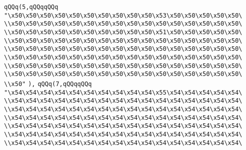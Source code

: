 \verb|qQQq(5,qQQqqQQq|\newline
\verb|"\x50\x50\x50\x50\x50\x50\x50\x50\x50\x50\x53\x50\x50\x50\x50\x50\|\newline
\verb|\\x50\x50\x50\x50\x50\x50\x50\x50\x50\x50\x50\x50\x50\x50\x50\x50\|\newline
\verb|\\x50\x50\x50\x50\x50\x50\x50\x50\x50\x50\x51\x50\x50\x50\x50\x50\|\newline
\verb|\\x50\x50\x50\x50\x50\x50\x50\x50\x50\x50\x50\x50\x50\x50\x50\x50\|\newline
\verb|\\x50\x50\x50\x50\x50\x50\x50\x50\x50\x50\x50\x50\x50\x50\x50\x50\|\newline
\verb|\\x50\x50\x50\x50\x50\x50\x50\x50\x50\x50\x50\x50\x50\x50\x50\x50\|\newline
\verb|\\x50\x50\x50\x50\x50\x50\x50\x50\x50\x50\x50\x50\x50\x50\x50\x50\|\newline
\verb|\\x50\x50\x50\x50\x50\x50\x50\x50\x50\x50\x50\x50\x50\x50\x50\x50\|\newline
\verb|\\x50"|\newline
\verb|),|\newline
\verb|qQQq(7,qQQqqQQq|\newline
\verb|"\x54\x54\x54\x54\x54\x54\x54\x54\x54\x54\x55\x54\x54\x54\x54\x54\|\newline
\verb|\\x54\x54\x54\x54\x54\x54\x54\x54\x54\x54\x54\x54\x54\x54\x54\x54\|\newline
\verb|\\x54\x54\x54\x54\x54\x54\x54\x54\x54\x54\x54\x54\x54\x54\x54\x54\|\newline
\verb|\\x54\x54\x54\x54\x54\x54\x54\x54\x54\x54\x54\x54\x54\x54\x54\x54\|\newline
\verb|\\x54\x54\x54\x54\x54\x54\x54\x54\x54\x54\x54\x54\x54\x54\x54\x54\|\newline
\verb|\\x54\x54\x54\x54\x54\x54\x54\x54\x54\x54\x54\x54\x54\x54\x54\x54\|\newline
\verb|\\x54\x54\x54\x54\x54\x54\x54\x54\x54\x54\x54\x54\x54\x54\x54\x54\|\newline
